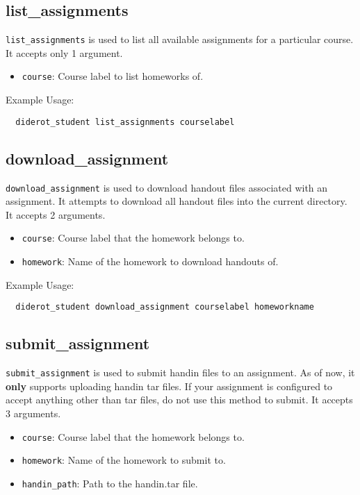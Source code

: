 \subsection{list\_assignments}

\verb|list_assignments| is used to list all available assignments for a particular course.
%
It accepts only 1 argument.
\begin{itemize}
  \item \verb|course|: Course label to list homeworks of.
\end{itemize}

Example Usage:
\begin{verbatim}
  diderot_student list_assignments courselabel
\end{verbatim}

\subsection{download\_assignment}

\verb|download_assignment| is used to download handout files associated with an assignment.
%
It attempts to download all handout files into the current directory.
% 
It accepts 2 arguments.

\begin{itemize}
  \item \verb|course|: Course label that the homework belongs to.
  \item \verb|homework|: Name of the homework to download handouts of.
\end{itemize}

Example Usage:
\begin{verbatim}
  diderot_student download_assignment courselabel homeworkname
\end{verbatim}

\subsection{submit\_assignment}

\verb|submit_assignment| is used to submit handin files to an assignment.
%
As of now, it \textbf{only} supports uploading handin tar files.
%
If your assignment is configured to accept anything other than tar files, 
do not use this method to submit.
%
It accepts 3 arguments.

\begin{itemize}
  \item \verb|course|: Course label that the homework belongs to.
  \item \verb|homework|: Name of the homework to submit to.
  \item \verb|handin_path|: Path to the handin.tar file.
\end{itemize}

